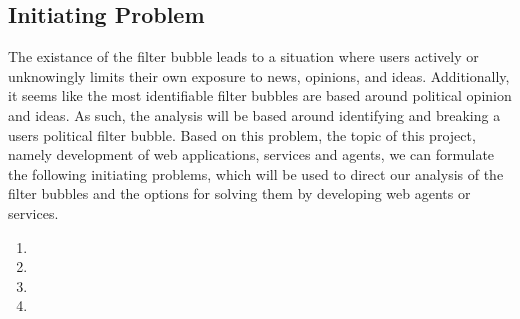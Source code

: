 \subsection*{Initiating Problem} 
The existance of the filter bubble leads to a situation where users actively or
unknowingly limits their own exposure to news, opinions, and ideas.
Additionally, it seems like the most identifiable filter bubbles are based
around political opinion and ideas. As such, the analysis will be based around
identifying and breaking a users political filter bubble.
Based on this problem, the topic of this project, namely development of web
applications, services and agents, we can formulate the following initiating
problems,  which will be used to direct our analysis of the filter bubbles and
the options for solving them by developing web agents or services.


\begin{center}
\begin{minipage}{0.95\linewidth}

\begin{enumerate}
  \item {}
  
  \item {}
  
  \item {}
  
  \item {}
  
\end{enumerate}

\end{minipage}
\end{center}


